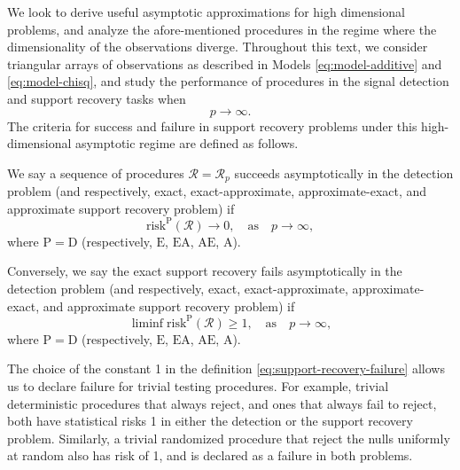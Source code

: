 
We look to derive useful asymptotic approximations for high dimensional problems, and analyze the afore-mentioned procedures in the regime where the dimensionality of the observations diverge.
Throughout this text, we consider triangular arrays of observations as described in Models \eqref{eq:model-additive} and \eqref{eq:model-chisq}, and study the performance of procedures in the signal detection and support recovery tasks when 
\begin{equation*}
  p\to\infty.
\end{equation*}
The criteria for success and failure in support recovery problems under this high-dimensional asymptotic regime are defined as follows.
\begin{definition} \label{def:exact-recovery-success-failure}
We say a sequence of procedures $\mathcal{R} = \mathcal{R}_p$ succeeds asymptotically in the detection problem (and respectively, exact, exact-approximate, approximate-exact, and approximate support recovery problem) if 
\begin{equation} \label{eq:support-recovery-success}
    \mathrm{risk}^{\mathrm{P}}(\mathcal{R}) \to 0, \quad \text{as}\quad p\to\infty,
\end{equation}
where $\mathrm{P}=\mathrm{D}$ (respectively, $\mathrm{E}$, $\mathrm{EA}$, $\mathrm{AE}$, $\mathrm{A}$).

Conversely, we say the exact support recovery fails asymptotically in the detection problem (and respectively, exact, exact-approximate, approximate-exact, and approximate support recovery problem) if 
\begin{equation} \label{eq:support-recovery-failure}
    \liminf\mathrm{risk}^{\mathrm{P}}(\mathcal{R}) \ge 1, \quad \text{as}\quad p\to\infty,
\end{equation}
where $\mathrm{P}=\mathrm{D}$ (respectively, $\mathrm{E}$, $\mathrm{EA}$, $\mathrm{AE}$, $\mathrm{A}$).
\end{definition}
The choice of the constant 1 in the definition \eqref{eq:support-recovery-failure} allows us to declare failure for trivial testing procedures. 
For example, trivial deterministic procedures that always reject, and ones that always fail to reject, both have statistical risks 1 in either the detection or the support recovery problem.
Similarly, a trivial randomized procedure that reject the nulls uniformly at random also has risk of 1, and is declared as a failure in both problems.

